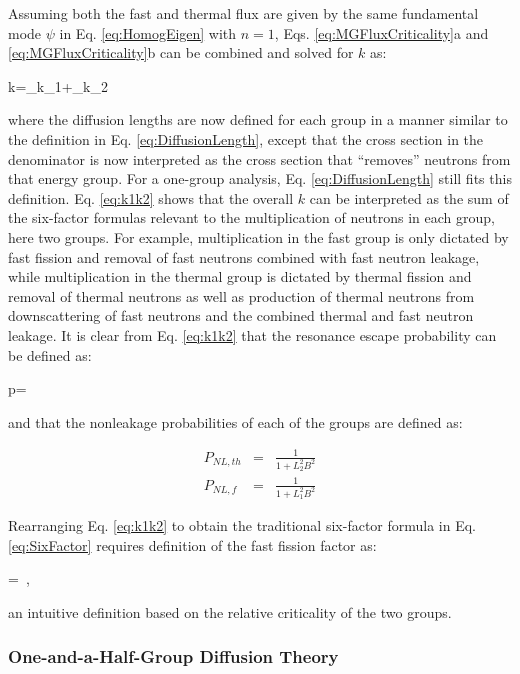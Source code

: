 Assuming both the fast and thermal flux are given by the same fundamental mode \(\psi\) in Eq. \eqref{eq:HomogEigen} with \(n=1\), Eqs. \eqref{eq:MGFluxCriticality}a and \eqref{eq:MGFluxCriticality}b can be combined and solved for \(k\) as:

\beq
\label{eq:k1k2}
k=_{k_1}+_{k_2}
\eeq

where the diffusion lengths are now defined for each group in a manner similar to the definition in Eq. \eqref{eq:DiffusionLength}, except that the cross section in the denominator is now interpreted as the cross section that ``removes'' neutrons from that energy group. For a one-group analysis, Eq. \eqref{eq:DiffusionLength} still fits this definition. Eq. \eqref{eq:k1k2} shows that the overall \(k\) can be interpreted as the sum of the six-factor formulas relevant to the multiplication of neutrons in each group, here two groups. For example, multiplication in the fast group is only dictated by fast fission and removal of fast neutrons combined with fast neutron leakage, while multiplication in the thermal group is dictated by thermal fission and removal of thermal neutrons as well as production of thermal neutrons from downscattering of fast neutrons and the combined thermal and fast neutron leakage. It is clear from Eq. \eqref{eq:k1k2} that the resonance escape probability can be defined as:

\beq
p=
\eeq

and that the nonleakage probabilities of each of the groups are defined as:

\begin{subequations}
\begin{eqnarray}
P_{NL,th}&=&\frac{1}{1+L_2^2B^2}\\
P_{NL,f}&=&\frac{1}{1+L_1^2B^2}
\end{eqnarray}
\end{subequations}

Rearranging Eq. \eqref{eq:k1k2} to obtain the traditional six-factor formula in Eq. \eqref{eq:SixFactor} requires definition of the fast fission factor as:

\beq
\epsilon=\ ,
\eeq

an intuitive definition based on the relative criticality of the two groups.

\subsubsection{One-and-a-Half-Group Diffusion Theory}


